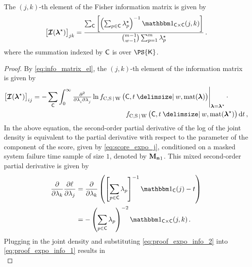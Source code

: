 \documentclass[
    11pt,
    extrafontsizes,
    article,
    oldfontcommands,
    final,
    oneside,
    openany,
    hidelinks]{memoir}
\begin{document}
The $(j,k)$-th element of the Fisher information matrix is given by
\begin{equation}
\label{eq:expo_info}
    \left [ \infomatrx(\tparam{\vec\lambda}) \right ]_{j k} =
        \frac
        {
            \sum_{\cand}
            \left [
                \left ( \sum_{p \in \cand} \tparam{\lambda}_p \right )^{-1}
                \SetIndicator{\cand \times \cand}(j,k)
            \right ]
        }
        {
            \binom{m-1}{w-1} \sum_{p=1}^{m} \tparam{\lambda}_p
        }\,.
\end{equation}
where the summation indexed by $\cand$ is over $\PS{\Set{K}}$.
\begin{proof}
By \cref{eq:info_matrix_el}, the $(j,k)$-th element of the information matrix is given by
\begin{equation}
\label{eq:proof_expo_info_1}
\begin{split}
    \left [ \infomatrx(\tparam{\vec\lambda}) \right ]_{i j}
    = - \sum_{\cand} \int_{0}^{\infty} &
        \eval
        {
            \md{}{2}{\lambda_i}{}{\lambda_j}{}
            \ln \jointpdf \left(\cand, t \Given w, \vectomat{\vec\lambda} \right)
        }_{\vec\lambda=\tparam{\vec\lambda}} 
        \cdot\\
        & \qquad \qquad \qquad \qquad \jointpdf \left(\cand, t \Given w, \vectomat{\tparam{\vec\lambda}} \right) \dif t\,,
\end{split}
\end{equation}
In the above equation, the second-order partial derivative of the log of the joint density is equivalent to the partial derivative with respect to the \kth parameter of the \jth component of the score, given by \cref{eq:score_expo_j}, conditioned on a masked system failure time sample of size $1$, denoted by $\boldsymbol{\mathbf{M_n}}_1$. This mixed second-order partial derivative is given by
\begin{align}
    \frac{\partial{}}{\partial \lambda_k} \frac{\partial \ell}{\partial \lambda_j}
        &= \frac{\partial{}}{\partial \lambda_k} \left (
            \left [ \sum_{p \in \cand} \lambda_p \right ]^{-1}
            \SetIndicator{\cand}(j) - t \right )\\
    \label{eq:proof_expo_info_2}
        &= -\left ( \sum_{p \in \cand} \lambda_p \right )^{-2} \SetIndicator{\cand \times \cand}(j,k)\,.
\end{align}
Plugging in the joint density and substituting \cref{eq:proof_expo_info_2} into \cref{eq:proof_expo_info_1} results in
\begin{equation}

\end{equation}
\end{proof}
\end{document}
